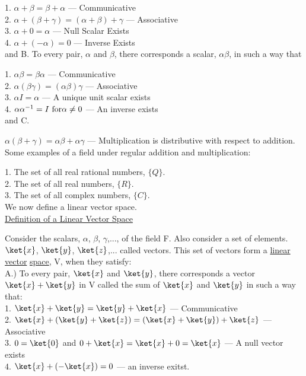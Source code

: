 1. $\alpha + \beta = \beta + \alpha$ \quad\quad 		--- Communicative\\
2. $\alpha + (\beta + \gamma) = (\alpha + \beta) + \gamma $ 	--- Associative\\
3. $\alpha + 0 = \alpha $					--- Null Scalar Exists\\
4. $\alpha + (-\alpha) = 0$					--- Inverse Exists\\

and B. To every pair, $\alpha$ and $\beta$, there corresponds a scalar, $\alpha\beta$, in such a way that 

1. $\alpha\beta = \beta\alpha$					--- Communicative\\
2. $\alpha(\beta\gamma) = (\alpha\beta)\gamma$			--- Associative\\
3. $\alpha I = \alpha$ 						--- A unique unit scalar exists\\
4. $\alpha \alpha^{-1} = I \rm ~ for \alpha \ne 0$		--- An inverse exists\\

and C. 

$\alpha(\beta + \gamma) = \alpha\beta + \alpha\gamma$		--- Multiplication is distributive with respect to 
addition.\\

Some examples of a field under regular addition and multiplication:

1. The set of all real rational numbers, $\{Q\}$.\\
2. The set of all real numbers, $\{R\}$. \\
3. The set of all complex numbers, $\{C\}$. \\

We now define a linear vector space.\\

\underline{Definition of a Linear Vector Space}

Consider the scalars, $\alpha$, $\beta$, $\gamma$,..., of the field F. Also consider a set of elements. $\ket{x}$, $
\ket{y}$, $\ket{z}$,... called vectors. This set of vectors form a \underline{linear} \underline{vector} \underline{space},
V, when they satisfy: \\

A.) To every pair, $\ket{x}$ and $\ket{y}$, there corresponds a vector $\ket{x} + \ket{y}$ in V 
called the sum of $\ket{x}$
and $\ket{y}$ in such a way that:\\

1. $\ket{x} + \ket{y} = \ket{y} + \ket{x}$ 		--- Communicative\\
2. $\ket{x} + (\ket{y} + \ket{z}) = (\ket{x} + \ket{y}) + \ket{z}$ --- Associative\\
3. $0 = \ket{0}$ and $0 + \ket{x} = \ket{x} + 0 = \ket{x}$	--- A null vector exists\\
4. $\ket{x} + (-\ket{x}) = 0$			--- an inverse exitst.\\

